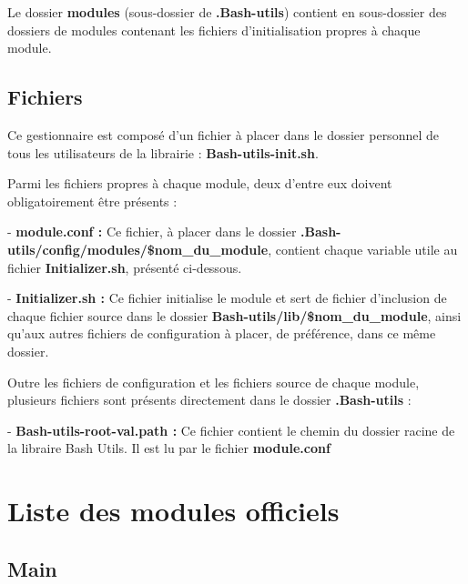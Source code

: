 \documentclass[a4paper,10pt]{article}
\begin{document}
  Le dossier \textbf{\color{lime}modules\color{white}} (sous-dossier de \textbf{\color{lime}.Bash-utils\color{white}}) contient en sous-dossier des dossiers de modules contenant les fichiers d'initialisation propres à chaque module.

  \color{green}
  \subsection{Fichiers}\color{white}
  Ce gestionnaire est composé d'un fichier à placer dans le dossier personnel de tous les utilisateurs de la librairie :  \textbf{\color{lime}Bash-utils-init.sh\color{white}}.\linebreak

  Parmi les fichiers propres à chaque module, deux d'entre eux doivent obligatoirement être présents :\linebreak

  - \textbf{\color{lime}module.conf\color{white} :} Ce fichier, à placer dans le dossier \textbf{\color{lime}.Bash-utils/config/modules/\$nom\_du\_module\color{white}}, contient chaque variable utile au fichier \textbf{\color{lime}Initializer.sh\color{white}}, présenté ci-dessous.\linebreak

  - \textbf{\color{lime}Initializer.sh\color{white} :} Ce fichier initialise le module et sert de fichier d'inclusion de chaque fichier source dans le dossier \textbf{\color{lime}Bash-utils/lib/\$nom\_du\_module\color{white}}, ainsi qu'aux autres fichiers de configuration à placer, de préférence, dans ce même dossier.\linebreak

  Outre les fichiers de configuration et les fichiers source de chaque module, plusieurs fichiers sont présents directement dans le dossier \textbf{\color{lime}.Bash-utils\color{white}} :\linebreak

  - \textbf{\color{lime}Bash-utils-root-val.path\color{white} :} Ce fichier contient le chemin du dossier racine de la libraire Bash Utils. Il est lu par le fichier \textbf{\color{lime}module.conf\color{white}}

 \color{red}
 \section{Liste des modules officiels}\color{white}

  \color{green}
  \subsection{Main}\color{white}
\end{document}
